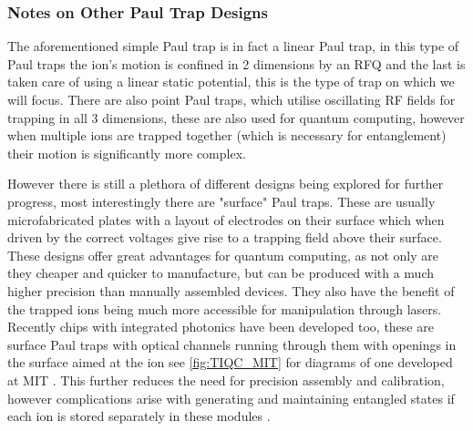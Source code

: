 \subsubsection{Notes on Other Paul Trap Designs} \label{sec:other_paultraps}
The aforementioned simple Paul trap is in fact a linear Paul trap, in this type of Paul traps the ion's motion is confined in 2 dimensions by an RFQ and the last is taken care of using a linear static potential, this is the type of trap on which we will focus.
There are also point Paul traps, which utilise oscillating RF fields for trapping in all 3 dimensions, these are also used for quantum computing, however when multiple ions are trapped together (which is necessary for entanglement) their motion is significantly more complex.

However there is still a plethora of different designs being explored for further progress, most interestingly there are "surface" Paul traps.
These are usually microfabricated plates with a layout of electrodes on their surface which when driven by the correct voltages give rise to a trapping field above their surface.
These designs offer great advantages for quantum computing, as not only are they cheaper and quicker to manufacture, but can be produced with a much higher precision than manually assembled devices.
They also have the benefit of the trapped ions being much more accessible for manipulation through lasers.
Recently chips with integrated photonics have been developed too, these are surface Paul traps with optical channels running through them with openings in the surface aimed at the ion see \cref{fig:TIQC_MIT} for diagrams of one developed at MIT \cite{niffeneggerIntegratedMultiwavelengthControl2020}.
This further reduces the need for precision assembly and calibration, however complications arise with generating and maintaining entangled states if each ion is stored separately in these modules \cite{bruzewiczTrappedionQuantumComputing2019}.


